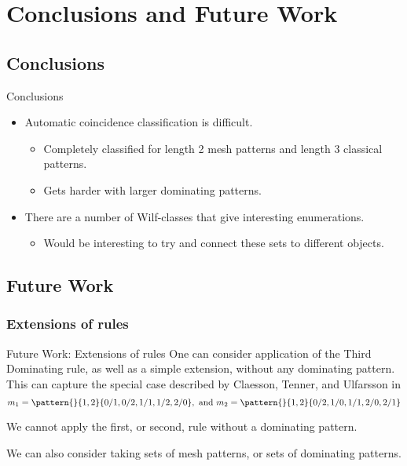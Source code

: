\section{Conclusions and Future Work}
\label{sec:Conclusions and Future Work}
\subsection{Conclusions}
\label{sub:Conclusions}
\begin{frame}{Conclusions}
  \begin{itemize}
  \item Automatic coincidence classification is difficult.
  \begin{itemize}
    \item Completely classified for length 2 mesh patterns and length 3 classical patterns.
    \item Gets harder with larger dominating patterns.
  \end{itemize}
  \item There are a number of Wilf-classes that give interesting
  enumerations.
  \begin{itemize}
    \item Would be interesting to try and connect these sets to different objects.
  \end{itemize}
  \end{itemize}
\end{frame}
\subsection{Future Work}
\label{sub:Future Work}
\subsubsection{Extensions of rules}
\label{subs:Extensions of rules}
\begin{frame}{Future Work: Extensions of rules}
    One can consider application of the Third Dominating rule, as well as a
    simple extension, without any dominating pattern. This can capture the special
    case described by Claesson, Tenner, and Ulfarsson in \cite{ABH}
    \begin{equation*}
     m_1 = \pattern{}{1,2}{0/1,0/2,1/1,1/2,2/0}, \text{ and } m_2 = \pattern{}{1,2}{0/2,1/0,1/1,2/0,2/1}
   \end{equation*}

   We cannot apply the first, or second, rule without a dominating pattern.

   We can also consider taking sets of mesh patterns, or sets of dominating patterns.
\end{frame}

